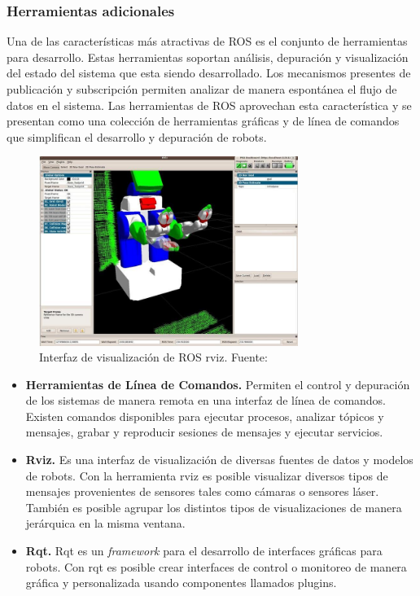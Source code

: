         \subsubsection{Herramientas adicionales}
        Una de las características más atractivas de ROS es el conjunto de herramientas para desarrollo. Estas herramientas 
        soportan análisis, depuración y visualización del estado del sistema que esta siendo desarrollado. Los mecanismos presentes
        de publicación y subscripción permiten analizar de manera espontánea el flujo de datos en el sistema. Las herramientas 
        de ROS aprovechan esta característica y se presentan como una colección de herramientas gráficas y de línea de comandos que 
        simplifican el desarrollo y depuración de robots.

        \begin{figure}[!h] 
            \centering
            \includegraphics[width=0.75\textwidth]{img/rviz}
            \caption[Interfaz de visualización de ROS rviz]{Interfaz de visualización de ROS rviz. Fuente: \cite{roswiki} }
            \label{fig:rviz}
        \end{figure}

        \begin{itemize}
            \item \textbf{Herramientas de Línea de Comandos.} Permiten el control y depuración de los sistemas 
            de manera remota en una interfaz de línea de comandos. Existen comandos disponibles para ejecutar procesos, 
            analizar tópicos y mensajes, grabar y reproducir sesiones de mensajes y ejecutar servicios.

            \item \textbf{Rviz.} Es una interfaz de visualización de diversas fuentes de datos y modelos de robots. 
            Con la herramienta rviz es posible visualizar diversos tipos de mensajes provenientes de sensores tales 
            como cámaras o sensores láser. También es posible agrupar los distintos tipos de visualizaciones de manera 
            jerárquica en la misma ventana.

            \item \textbf{Rqt.} Rqt es un \textit{framework} para el desarrollo de interfaces gráficas para robots. 
            Con rqt es posible crear interfaces de control o monitoreo de manera gráfica y personalizada usando 
            componentes llamados plugins.

        \end{itemize}


